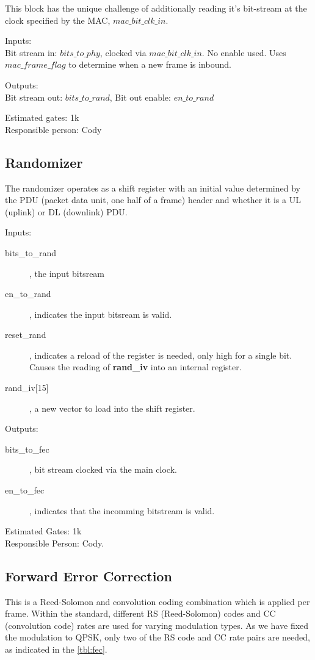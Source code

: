 \documentclass[10pt]{article}
\begin{document}
	This block has the unique challenge of additionally reading it's
	bit-stream at the clock specified by the MAC, $mac\_bit\_clk\_in$.

	Inputs: \\
	Bit stream in: $bits\_to\_phy$, clocked via $mac\_bit\_clk\_in$.  No
	enable used. Uses $mac\_frame\_flag$ to determine when a new frame is
	inbound.
	
	Outputs: \\
	Bit stream out: $bits\_to\_rand$, Bit out enable: $en\_to\_rand$

	Estimated gates: 1k \\
	Responsible person: Cody

	\subsection{Randomizer}
	\label{sec:rand}
	The randomizer operates as a shift register with an initial value
	determined by the PDU (packet data unit, one half of a frame) header
	and whether it is a UL (uplink) or DL (downlink) PDU.

	\begin{description}
		\item{Inputs:}
		\begin{description}
			\item[bits\_to\_rand], the input bitsream
			\item[en\_to\_rand], indicates the input bitsream
				is valid.
			\item[reset\_rand], indicates a reload of the
				register is needed, only high for a single
				bit. Causes the reading of \textbf{rand\_iv}
				into an internal register.
			\item[rand\_iv{[15]}], a new vector to load into
				the shift register.
		\end{description}
		\item{Outputs:}
		\begin{description}
			\item[bits\_to\_fec], bit stream clocked via the
				main clock.
			\item[en\_to\_fec], indicates that the incomming
				bitstream is valid.
		\end{description}
	\end{description}

	Estimated Gates: 1k \\
	Responsible Person: Cody.

	\subsection{Forward Error Correction}
		\label{sec:fec}
		This is a Reed-Solomon and convolution coding combination
		which is applied per frame. Within the standard, different
		RS (Reed-Solomon) codes and CC (convolution code) rates are
		used for varying modulation types. As we have fixed the
		modulation to QPSK, only two of the RS code and CC rate
		pairs are needed, as indicated in the \autoref{tbl:fec}.
		
\end{document}
